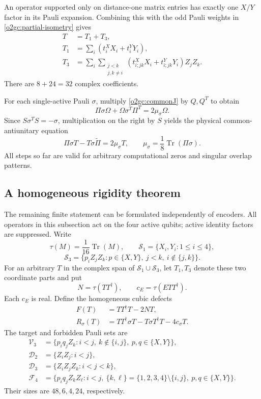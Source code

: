 An operator supported only on distance-one matrix entries has exactly
one \(X/Y\) factor in its Pauli expansion. Combining this with the odd
Pauli weights in \eqref{o2gc:partial-isometry} gives
\begin{align}
 T&=T_1+T_3,\label{o2gc:T-support}\\
 T_1&=\sum_i(t_i^XX_i+t_i^YY_i),\nonumber\\
 T_3&=\sum_i\sum_{\substack{j<k\\j,k\ne i}}
          (t_{i;jk}^XX_i+t_{i;jk}^YY_i)Z_jZ_k.\nonumber
\end{align}
There are \(8+24=32\) complex coefficients.

For each single-active Pauli \(\sigma\), multiply
\eqref{o2gc:commonJ} by \(Q,Q^T\) to obtain
\[
 \Pi\sigma\Omega+\Omega\sigma^T\Pi^T=2\mu_\sigma\Omega.
\]
Since \(S\sigma^TS=-\sigma\), multiplication on the right by \(S\)
yields the physical common-antiunitary equation
\begin{equation}
 \Pi\sigma T-T\sigma\widetilde\Pi=2\mu_\sigma T,\qquad
 \mu_\sigma=\frac18\operatorname{Tr}(\Pi\sigma).
 \label{o2gc:physical-J}
\end{equation}
All steps so far are valid for arbitrary computational zeros and
singular overlap patterns.

\subsection{A homogeneous rigidity theorem}
\label{o2gc:subsec-rigidity}

The remaining finite statement can be formulated independently of
encoders. All operators in this subsection act on the four active
qubits; active identity factors are suppressed. Write
\[
 \tau(M)=\frac1{16}\operatorname{Tr}(M),\qquad
 \mathcal S_1=\{X_i,Y_i:1\le i\le4\},
\]
\[
 \mathcal S_3=\{p_iZ_jZ_k:p\in\{X,Y\},\ j<k,\ i\notin\{j,k\}\}.
\]
For an arbitrary \(T\) in the complex span of
\(\mathcal S_1\cup\mathcal S_3\), let \(T_1,T_3\) denote these two
coordinate parts and put
\begin{equation}
 N=\tau(TT^\dagger),\qquad c_E=\tau(ETT^\dagger).
 \label{o2gc:homogeneous-scalars}
\end{equation}
Each \(c_E\) is real. Define the homogeneous cubic defects
\begin{align}
 F(T)&=TT^\dagger T-2NT,\label{o2gc:defects}\\
 R_\sigma(T)&=TT^\dagger\sigma T-T\sigma T^\dagger T-4c_\sigma T.
 \nonumber
\end{align}
The target and forbidden Pauli sets are
\begin{align}
 \mathcal V_3&=\{p_iq_jZ_k:i<j,\ k\notin\{i,j\},\
                                  p,q\in\{X,Y\}\},\nonumber\\
 \mathcal D_2&=\{Z_iZ_j:i<j\},\nonumber\\
 \mathcal D_3&=\{Z_iZ_jZ_k:i<j<k\},\nonumber\\
 \mathcal F_4&=\{p_iq_jZ_kZ_\ell:i<j,\
                \{k,\ell\}=\{1,2,3,4\}\setminus\{i,j\},\
                p,q\in\{X,Y\}\}.
 \label{o2gc:Pauli-sets}
\end{align}
Their sizes are \(48,6,4,24\), respectively.


